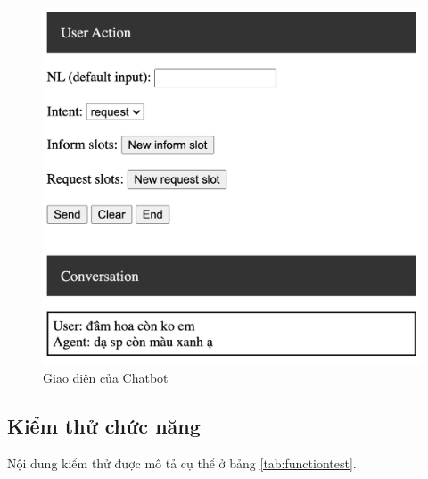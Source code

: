 \begin{center}
    \begin{figure}[h!]
        \begin{center}
         \includegraphics[scale=0.6]{chapter7/img/test_tool.png}
        \end{center}
        \caption{Giao diện của Chatbot}
        \label{fig:testtool}
    \end{figure}
\end{center}

\subsection{Kiểm thử chức năng}
Nội dung kiểm thử được mô tả cụ thể ở bảng \ref{tab:functiontest}.

